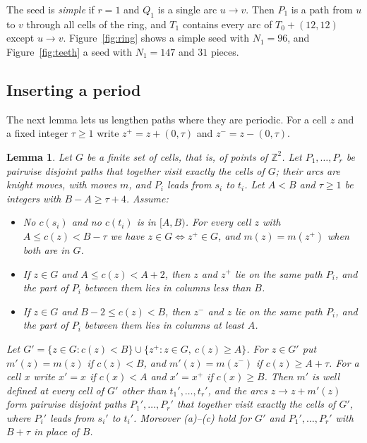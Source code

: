 \documentclass[11pt]{amsart}
\newtheorem{lemma}[theorem]{Lemma}
\theoremstyle{remark}
\begin{document}
The seed is \emph{simple} if $r=1$ and $Q_1$ is a single arc $u\to v$. Then $P_1$ is a path from $u$ to $v$ through
all cells of the ring, and $T_1$ contains every arc of $T_0+(12,12)$ except $u\to v$. Figure~\ref{fig:ring} shows a
simple seed with $N_1=96$, and Figure~\ref{fig:teeth} a seed with $N_1=147$ and $31$ pieces.

\subsection*{Inserting a period}
The next lemma lets us lengthen paths where they are periodic. For a cell $z$ and a fixed integer $\tau\ge1$ write
$z^+=z+(0,\tau)$ and $z^-=z-(0,\tau)$.

\begin{lemma}\label{lem:insert}
Let $G$ be a finite set of cells, that is, of points of $\mathbb Z^2$. Let $P_1,\dots,P_r$ be pairwise disjoint paths
that together visit exactly the cells of $G$; their arcs are knight moves, with moves $m$, and $P_i$ leads from
$s_i$ to $t_i$. Let $A<B$ and $\tau\ge1$ be integers with $B-A\ge\tau+4$. Assume:
\begin{itemize}
\item[(a)] No $c(s_i)$ and no $c(t_i)$ is in $[A,B)$. For every cell $z$ with $A\le c(z)<B-\tau$ we have
$z\in G\iff z^+\in G$, and $m(z)=m(z^+)$ when both are in $G$.
\item[(b)] If $z\in G$ and $A\le c(z)<A+2$, then $z$ and $z^+$ lie on the same path $P_i$, and the part of $P_i$
between them lies in columns less than $B$.
\item[(c)] If $z\in G$ and $B-2\le c(z)<B$, then $z^-$ and $z$ lie on the same path $P_i$, and the part of $P_i$
between them lies in columns at least $A$.
\end{itemize}
Let $G'=\{z\in G:c(z)<B\}\cup\{z^+:z\in G,\ c(z)\ge A\}$. For $z\in G'$ put $m'(z)=m(z)$ if $c(z)<B$, and
$m'(z)=m(z^-)$ if $c(z)\ge A+\tau$. For a cell $x$ write $x'=x$ if $c(x)<A$ and $x'=x^+$ if $c(x)\ge B$. Then $m'$
is well defined at every cell of $G'$ other than $t_1',\dots,t_r'$, and the arcs $z\to z+m'(z)$ form pairwise
disjoint paths $P_1',\dots,P_r'$ that together visit exactly the cells of $G'$, where $P_i'$ leads from $s_i'$ to
$t_i'$. Moreover \textup{(a)--(c)} hold for $G'$ and $P_1',\dots,P_r'$ with $B+\tau$ in place of $B$.
\end{lemma}
\end{document}
